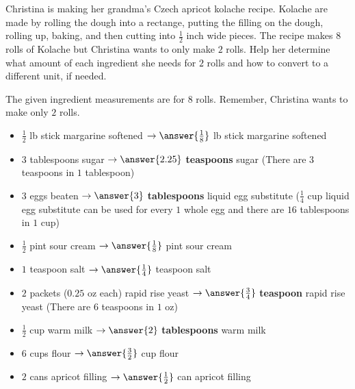 \documentclass{ximera}
\author{Carolyn Johns}
\begin{document}
\begin{exercise}
Christina is making her grandma's Czech apricot kolache recipe. Kolache are made by rolling the dough into a rectange, putting the filling on the dough, rolling up, baking, and then cutting into $\frac{1}{2}$ inch wide pieces. The recipe makes $8$ rolls of Kolache but Christina wants to only make $2$ rolls. Help her determine what amount of each ingredient she needs for $2$ rolls and how to convert to a different unit, if needed.

The given ingredient measurements are for $8$ rolls.  Remember, Christina wants to make only $2$ rolls.

\begin{itemize}

\item $\frac{1}{2}$ lb stick margarine softened $ \rightarrow \answer{\frac{1}{8}}$ lb stick margarine softened
\item $3$ tablespoons sugar $ \rightarrow \answer{2.25}$ \textbf{teaspoons} sugar (There are $3$ teaspoons in $1$ tablespoon)
\item $3$ eggs beaten $ \rightarrow \answer{3}$ \textbf{tablespoons} liquid egg substitute ($\frac{1}{4}$ cup liquid egg substitute can be used for every $1$ whole egg and there are $16$ tablespoons in $1$ cup) 
\item $\frac{1}{2}$ pint sour cream $ \rightarrow \answer{\frac{1}{8}}$ pint sour cream
\item $1$ teaspoon salt $ \rightarrow \answer{\frac{1}{4}}$ teaspoon salt
\item $2$ packets ($0.25$ oz each) rapid rise yeast $ \rightarrow \answer{\frac{3}{4}}$ \textbf{teaspoon} rapid rise yeast (There are $6$ teaspoons in $1$ oz)
\item $\frac{1}{2}$ cup warm milk  $ \rightarrow \answer{2}$ \textbf{tablespoons} warm milk
\item $6$ cups flour  $ \rightarrow \answer{\frac{3}{2}}$ cup flour 
\item $2$ cans apricot filling $ \rightarrow \answer{\frac{1}{2}}$ can apricot filling 

\end{itemize}

\end{exercise}
\end{document}
